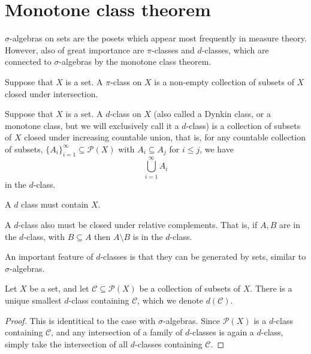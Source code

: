 \documentclass{owmaths}
\begin{document}
\section{Monotone class theorem}
$\sigma$-algebras on sets are the posets which appear most frequently in measure theory.
However, also of great importance are $\pi$-classes and $d$-classes, which
are connected to $\sigma$-algebras by the monotone class theorem.

\begin{definition}
    Suppose that $X$ is a set. A $\pi$-class on $X$ is a non-empty collection of subsets
    of $X$ closed under intersection.
\end{definition}

\begin{definition}
    Suppose that $X$ is a set. A $d$-class on $X$ (also called a Dynkin class, or a monotone class, but
    we will exclusively call it a $d$-class) is a collection of subsets
    of $X$ closed under increasing countable union, that is, for any countable collection
    of subsets, $\{A_i\}_{i=1}^\infty \subseteq \mathcal{P}(X)$ with $A_i \subseteq A_j$
    for $i \leq j$, we have
    \begin{equation*}
        \bigcup_{i=1}^\infty A_i
    \end{equation*}
    in the $d$-class.
    
    A $d$ class must contain $X$.
    
    A $d$-class also must be closed under relative complements. That is, if $A,B$
    are in the $d$-class, with $B \subseteq A$ then $A \setminus B$ is in the $d$-class.
    
\end{definition}

An important feature of $d$-classes is that they can be generated by sets, similar
to $\sigma$-algebras.
\begin{proposition}
    Let $X$ be a set, and let $\mathcal{C} \subseteq \mathcal{P}(X)$
    be a collection of subsets of $X$. There is a unique smallest $d$-class
    containing $\mathcal{C}$, which we denote $d(\mathcal{C})$.
\end{proposition}
\begin{proof}
    This is identitical to the case with $\sigma$-algebras. Since $\mathcal{P}(X)$
    is a $d$-class containing $\mathcal{C}$, and any intersection of a family of $d$-classes
    is again a $d$-class, simply take the intersection of all $d$-classes containing $\mathcal{C}$.
\end{proof}
\end{document}
